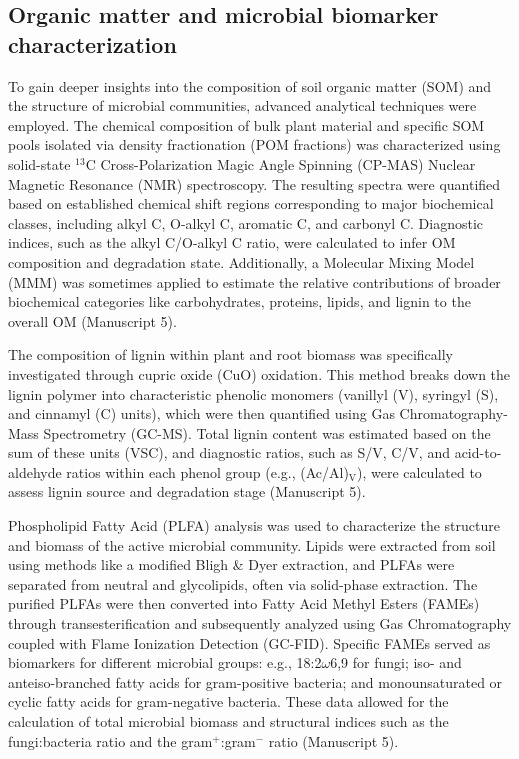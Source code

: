 \subsection{Organic matter and microbial biomarker characterization}

To gain deeper insights into the composition of soil organic matter (SOM) and the structure of microbial communities, advanced analytical techniques were employed. The chemical composition of bulk plant material and specific SOM pools isolated via density fractionation (POM fractions) was characterized using solid-state $^{13}$C Cross-Polarization Magic Angle Spinning (CP-MAS) Nuclear Magnetic Resonance (NMR) spectroscopy. The resulting spectra were quantified based on established chemical shift regions corresponding to major biochemical classes, including alkyl C, O-alkyl C, aromatic C, and carbonyl C. Diagnostic indices, such as the alkyl C/O-alkyl C ratio, were calculated to infer OM composition and degradation state. Additionally, a Molecular Mixing Model (MMM) was sometimes applied to estimate the relative contributions of broader biochemical categories like carbohydrates, proteins, lipids, and lignin to the overall OM (Manuscript 5).

The composition of lignin within plant and root biomass was specifically investigated through cupric oxide (CuO) oxidation. This method breaks down the lignin polymer into characteristic phenolic monomers (vanillyl (V), syringyl (S), and cinnamyl (C) units), which were then quantified using Gas Chromatography-Mass Spectrometry (GC-MS). Total lignin content was estimated based on the sum of these units (VSC), and diagnostic ratios, such as S/V, C/V, and acid-to-aldehyde ratios within each phenol group (e.g., (Ac/Al)$_\mathrm{V}$), were calculated to assess lignin source and degradation stage (Manuscript 5).

Phospholipid Fatty Acid (PLFA) analysis was used to characterize the structure and biomass of the active microbial community. Lipids were extracted from soil using methods like a modified Bligh \& Dyer extraction, and PLFAs were separated from neutral and glycolipids, often via solid-phase extraction. The purified PLFAs were then converted into Fatty Acid Methyl Esters (FAMEs) through transesterification and subsequently analyzed using Gas Chromatography coupled with Flame Ionization Detection (GC-FID). Specific FAMEs served as biomarkers for different microbial groups: e.g., 18:2$\omega$6,9 for fungi; iso- and anteiso-branched fatty acids for gram-positive bacteria; and monounsaturated or cyclic fatty acids for gram-negative bacteria. These data allowed for the calculation of total microbial biomass and structural indices such as the fungi:bacteria ratio and the gram$^{+}$:gram$^{-}$ ratio (Manuscript 5).

